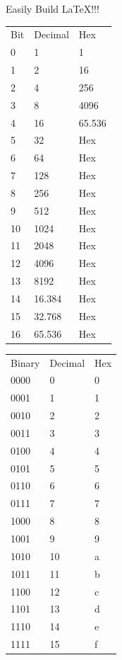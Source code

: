 \documentclass[12pt,landscape,a4paper]{article}
\begin{document}
\raggedright
\footnotesize
\begin{multicols}{4}

\begin{minipage}[t]{\linewidth}
Easily Build LaTeX!!!
\begin{tabular}{l | l | l}
    Bit & Decimal & Hex \\
    0 & 1 & 1 \\
    1 & 2 & 16 \\
    2 & 4 & 256 \\
    3 & 8 & 4096 \\
    4 & 16 & 65.536 \\
    5 & 32 & Hex \\
    6 & 64 & Hex \\
    7 & 128 & Hex \\
    8 & 256 & Hex \\
    9 & 512 & Hex \\
    10 & 1024 & Hex \\
    11 & 2048 & Hex \\
    12 & 4096 & Hex \\
    13 & 8192 & Hex \\
    14 & 16.384 & Hex \\
    15 & 32.768 & Hex \\
    16 & 65.536 & Hex \\
\end{tabular}

\begin{tabular}{l | l | l}
    Binary & Decimal & Hex \\
    0000 & 0 & 0 \\
    0001 & 1 & 1 \\
    0010 & 2 & 2 \\
    0011 & 3 & 3 \\
    0100 & 4 & 4 \\
    0101 & 5 & 5 \\
    0110 & 6 & 6 \\
    0111 & 7 & 7 \\
    1000 & 8 & 8 \\
    1001 & 9 & 9 \\
    1010 & 10 & a \\
    1011 & 11 & b \\
    1100 & 12 & c \\
    1101 & 13 & d \\
    1110 & 14 & e \\
    1111 & 15 & f \\
\end{tabular}


\end{minipage}
\end{multicols}
\end{document}
